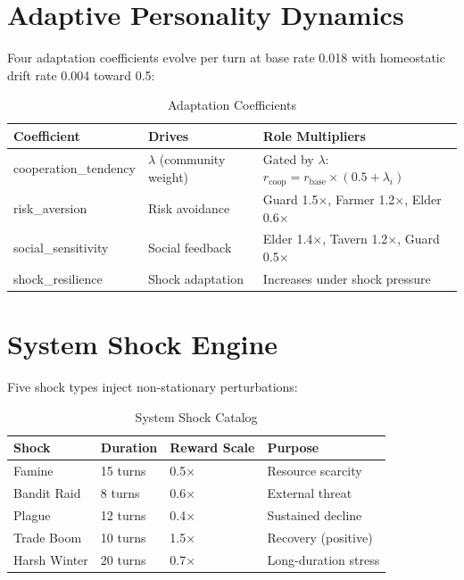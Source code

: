 \documentclass[12pt, a4paper, oneside]{report}
\begin{document}
\section{Adaptive Personality Dynamics}
\label{sec:adaptation}

Four adaptation coefficients evolve per turn at base rate 0.018 with homeostatic drift rate 0.004 toward 0.5:

\begin{table}[H]
\centering
\caption{Adaptation Coefficients}
\label{tab:adaptation}
\begin{tabular}{lll}
\toprule
\textbf{Coefficient} & \textbf{Drives} & \textbf{Role Multipliers} \\
\midrule
cooperation\_tendency & $\lambda$ (community weight) & Gated by $\lambda$: $r_{\text{coop}} = r_{\text{base}} \times (0.5 + \lambda_i)$ \\
risk\_aversion & Risk avoidance & Guard 1.5$\times$, Farmer 1.2$\times$, Elder 0.6$\times$ \\
social\_sensitivity & Social feedback & Elder 1.4$\times$, Tavern 1.2$\times$, Guard 0.5$\times$ \\
shock\_resilience & Shock adaptation & Increases under shock pressure \\
\bottomrule
\end{tabular}
\end{table}

\section{System Shock Engine}
\label{sec:shock-engine}

Five shock types inject non-stationary perturbations:

\begin{table}[H]
\centering
\caption{System Shock Catalog}
\label{tab:shocks}
\begin{tabular}{llll}
\toprule
\textbf{Shock} & \textbf{Duration} & \textbf{Reward Scale} & \textbf{Purpose} \\
\midrule
Famine & 15 turns & 0.5$\times$ & Resource scarcity \\
Bandit Raid & 8 turns & 0.6$\times$ & External threat \\
Plague & 12 turns & 0.4$\times$ & Sustained decline \\
Trade Boom & 10 turns & 1.5$\times$ & Recovery (positive) \\
Harsh Winter & 20 turns & 0.7$\times$ & Long-duration stress \\
\bottomrule
\end{tabular}
\end{table}
\end{document}
